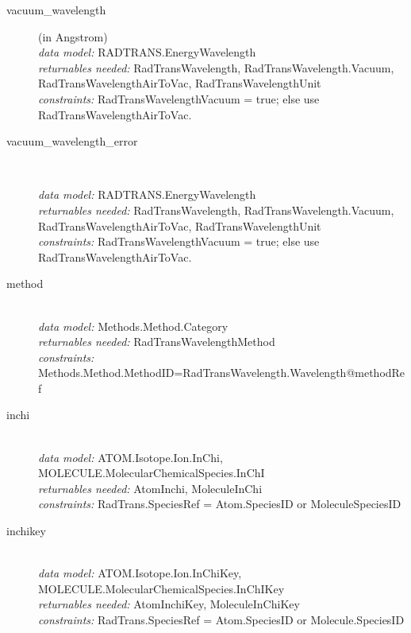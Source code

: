 \documentclass[11pt,a4paper]{ivoa}
\begin{document}
\renewcommand{\descriptionlabel}[1]{\hspace{\labelsep}\texttt{#1}}
\begin{description}

\item [vacuum\_wavelength] (in Angstrom)\hfill\\
    \textit{data model:} RADTRANS.EnergyWavelength\\
	\textit{returnables needed:} RadTransWavelength, RadTransWavelength.Vacuum, RadTransWavelengthAirToVac, RadTransWavelengthUnit\\
	\textit{constraints:} RadTransWavelengthVacuum = true; else use RadTransWavelengthAirToVac.\\
	
\item [vacuum\_wavelength\_error]  \hfill\\

    \textit{data model:} RADTRANS.EnergyWavelength\\
	\textit{returnables needed:} RadTransWavelength, RadTransWavelength.Vacuum, RadTransWavelengthAirToVac, RadTransWavelengthUnit\\
	\textit{constraints:} RadTransWavelengthVacuum = true; else use RadTransWavelengthAirToVac.\\
	
\item [method] \hfill\\
	\textit{data model:} Methods.Method.Category\\
	\textit{returnables needed:} RadTransWavelengthMethod\\
	\textit{constraints:} Methods.Method.MethodID=RadTransWavelength.Wavelength@methodRef\\

\item [inchi] \hfill\\
	\textit{data model:} ATOM.Isotope.Ion.InChi,  MOLECULE.MolecularChemicalSpecies.InChI\\
        \textit{returnables needed:} AtomInchi, MoleculeInChi\\
	\textit{constraints:} RadTrans.SpeciesRef = Atom.SpeciesID or MoleculeSpeciesID
	
\item [inchikey] \hfill\\
	\textit{data model:} ATOM.Isotope.Ion.InChiKey, MOLECULE.MolecularChemicalSpecies.InChIKey \\
         \textit{returnables needed:} AtomInchiKey, MoleculeInChiKey\\
         \textit{constraints:} RadTrans.SpeciesRef = Atom.SpeciesID or  Molecule.SpeciesID


\end{description}
\end{document}
